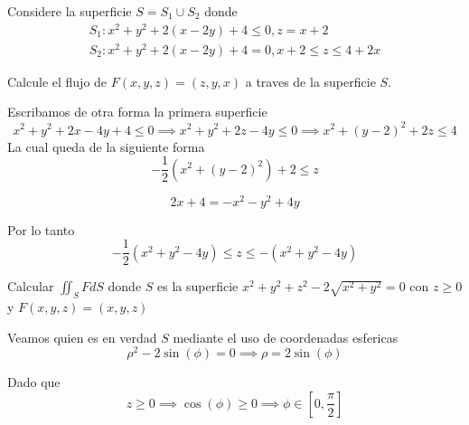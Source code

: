 \documentclass[../main.tex]{subfiles}
\begin{document}
\begin{problem}
  Considere la superficie $S = S_{1} \cup S_{2}$ donde
  \begin{gather*}
    S_{1} : x^{2} + y^{2} + 2(x - 2y) + 4 \leq 0, z = x + 2\\
    S_{2} : x^{2} + y^{2} + 2(x - 2y) + 4 = 0, x + 2 \leq z \leq 4 + 2x
  \end{gather*}

  Calcule el flujo de $F(x, y, z) = (z, y, x)$ a traves de la superficie $S$.
\end{problem}
\begin{solution}
  Escribamos de otra forma la primera superficie
  \begin{equation*}
    x^{2} + y^{2} + 2x - 4y + 4 \leq 0 \implies x^{2} + y^{2} + 2z - 4y \leq 0 \implies x^{2} + (y - 2)^{2} + 2z \leq 4
  \end{equation*}
  La cual queda de la siguiente forma
  \begin{equation*}
    -\frac{1}{2}(x^{2} + (y - 2)^{2}) + 2 \leq z
  \end{equation*}

  \begin{equation*}
    2x + 4 = -x^{2} -y^{2} + 4y
  \end{equation*}

  Por lo tanto
  \begin{equation*}
    -\frac{1}{2}(x^{2} + y^{2} - 4y) \leq z \leq -(x^{2} + y^{2} - 4y)
  \end{equation*}
\end{solution}

\begin{problem}
  Calcular $\iint_{S} F dS$ donde $S$ es la superficie $x^{2} + y^{2} + z^{2} - 2\sqrt{x^{2} + y^{2}} = 0$ con $z \geq 0$ y $F(x, y, z) = (x, y, z)$
\end{problem}
\begin{solution}
  Veamos quien es en verdad $S$ mediante el uso de coordenadas esfericas
  \begin{equation*}
    \rho^{2} - 2\sin(\phi) = 0 \implies \rho = 2 \sin(\phi)
  \end{equation*}

  Dado que
  \begin{equation*}
    z \geq 0 \implies \cos(\phi) \geq 0 \implies \phi \in [0, \frac{\pi}{2}]
  \end{equation*}
\end{solution}
\end{document}
